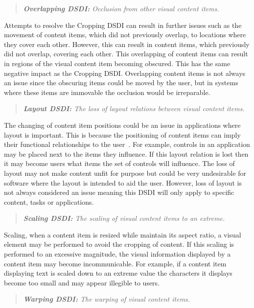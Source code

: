 \documentclass[review,5p,times,twocolumn]{elsarticle}
\begin{document}
\begin{quote}\emph{\textbf{Overlapping \ac{DSDI}:} Occlusion from other visual content items.}\end{quote}

Attempts to resolve the Cropping \ac{DSDI} can result in further issues such as the movement of content items, which did not previously overlap, to locations where they cover each other.
However, this can result in content items, which previously did not overlap, covering each other.
This overlapping of content items can result in regions of the visual content item becoming obscured.
This has the same negative impact as the Cropping \ac{DSDI}.
Overlapping content items is not always an issue since the obscuring items could be moved by the user, but in systems where these items are immovable the occlusion would be irreparable.

\begin{quote}\emph{\textbf{Layout \ac{DSDI}:} The loss of layout relations between visual content items.}\end{quote}

The changing of content item positions could be an issue in applications where layout is important.
This is because the positioning of content items can imply their functional relationships to the user~\cite{Constantine1999}.
For example, controls in an application may be placed next to the items they influence.
If this layout relation is lost then it may become users what items the set of controls will influence. 
The loss of layout may not make content unfit for purpose but could be very undesirable for software where the layout is intended to aid the user.
However, loss of layout is not always considered an issue meaning this \ac{DSDI} will only apply to specific content, tasks or applications.

\begin{quote}\emph{\textbf{Scaling \ac{DSDI}:} The scaling of visual content items to an extreme.}\end{quote}

Scaling, when a content item is resized while maintain its aspect ratio, a visual element may be performed to avoid the cropping of content.
If this scaling is performed to an excessive magnitude, the visual information displayed by a content item may become incommunicable.
For example, if a content item displaying text is scaled down to an extreme value the characters it displays become too small and may appear illegible to users.

\begin{quote}\emph{\textbf{Warping \ac{DSDI}:} The warping of visual content items.}\end{quote}
\end{document}

